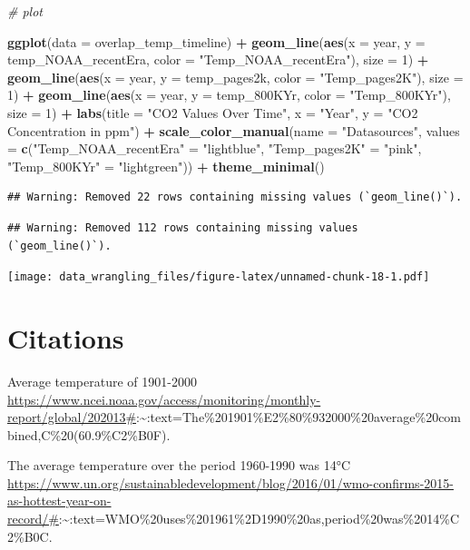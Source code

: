 \documentclass[
]{article}
\newenvironment{Shaded}{\begin{snugshade}}{\end{snugshade}}
\newcommand{\AttributeTok}[1]{\textcolor[rgb]{0.13,0.29,0.53}{#1}}
\newcommand{\CommentTok}[1]{\textcolor[rgb]{0.56,0.35,0.01}{\textit{#1}}}
\newcommand{\DecValTok}[1]{\textcolor[rgb]{0.00,0.00,0.81}{#1}}
\newcommand{\FunctionTok}[1]{\textcolor[rgb]{0.13,0.29,0.53}{\textbf{#1}}}
\newcommand{\NormalTok}[1]{#1}
\newcommand{\OtherTok}[1]{\textcolor[rgb]{0.56,0.35,0.01}{#1}}
\newcommand{\SpecialCharTok}[1]{\textcolor[rgb]{0.81,0.36,0.00}{\textbf{#1}}}
\newcommand{\StringTok}[1]{\textcolor[rgb]{0.31,0.60,0.02}{#1}}
\begin{document}
\begin{Shaded}
\begin{Highlighting}[]
\CommentTok{\# plot}

\FunctionTok{ggplot}\NormalTok{(}\AttributeTok{data =}\NormalTok{ overlap\_temp\_timeline) }\SpecialCharTok{+}
  \FunctionTok{geom\_line}\NormalTok{(}\FunctionTok{aes}\NormalTok{(}\AttributeTok{x =}\NormalTok{ year, }\AttributeTok{y =}\NormalTok{ temp\_NOAA\_recentEra, }\AttributeTok{color =} \StringTok{"Temp\_NOAA\_recentEra"}\NormalTok{), }\AttributeTok{size =} \DecValTok{1}\NormalTok{) }\SpecialCharTok{+}
  \FunctionTok{geom\_line}\NormalTok{(}\FunctionTok{aes}\NormalTok{(}\AttributeTok{x =}\NormalTok{ year, }\AttributeTok{y =}\NormalTok{ temp\_pages2k, }\AttributeTok{color =} \StringTok{"Temp\_pages2K"}\NormalTok{), }\AttributeTok{size =} \DecValTok{1}\NormalTok{) }\SpecialCharTok{+}
  \FunctionTok{geom\_line}\NormalTok{(}\FunctionTok{aes}\NormalTok{(}\AttributeTok{x =}\NormalTok{ year, }\AttributeTok{y =}\NormalTok{ temp\_800KYr, }\AttributeTok{color =} \StringTok{"Temp\_800KYr"}\NormalTok{), }\AttributeTok{size =} \DecValTok{1}\NormalTok{) }\SpecialCharTok{+}
  \FunctionTok{labs}\NormalTok{(}\AttributeTok{title =} \StringTok{"CO2 Values Over Time"}\NormalTok{,}
       \AttributeTok{x =} \StringTok{"Year"}\NormalTok{,}
       \AttributeTok{y =} \StringTok{"CO2 Concentration in ppm"}\NormalTok{) }\SpecialCharTok{+}
  \FunctionTok{scale\_color\_manual}\NormalTok{(}\AttributeTok{name =} \StringTok{"Datasources"}\NormalTok{, }\AttributeTok{values =} \FunctionTok{c}\NormalTok{(}\StringTok{"Temp\_NOAA\_recentEra"} \OtherTok{=} \StringTok{"lightblue"}\NormalTok{, }\StringTok{"Temp\_pages2K"} \OtherTok{=} \StringTok{"pink"}\NormalTok{, }\StringTok{"Temp\_800KYr"} \OtherTok{=} \StringTok{"lightgreen"}\NormalTok{)) }\SpecialCharTok{+}
  \FunctionTok{theme\_minimal}\NormalTok{()}
\end{Highlighting}
\end{Shaded}

\begin{verbatim}
## Warning: Removed 22 rows containing missing values (`geom_line()`).
\end{verbatim}

\begin{verbatim}
## Warning: Removed 112 rows containing missing values (`geom_line()`).
\end{verbatim}

\texttt{[image: data\_wrangling\_files/figure-latex/unnamed-chunk-18-1.pdf]}

\hypertarget{citations}{%
\section{Citations}\label{citations}}

Average temperature of 1901-2000
\url{https://www.ncei.noaa.gov/access/monitoring/monthly-report/global/202013\#}:\textasciitilde:text=The\%201901\%E2\%80\%932000\%20average\%20combined,C\%20(60.9\%C2\%B0F).

The average temperature over the period 1960-1990 was 14°C
\url{https://www.un.org/sustainabledevelopment/blog/2016/01/wmo-confirms-2015-as-hottest-year-on-record/\#}:\textasciitilde:text=WMO\%20uses\%201961\%2D1990\%20as,period\%20was\%2014\%C2\%B0C.
\end{document}
